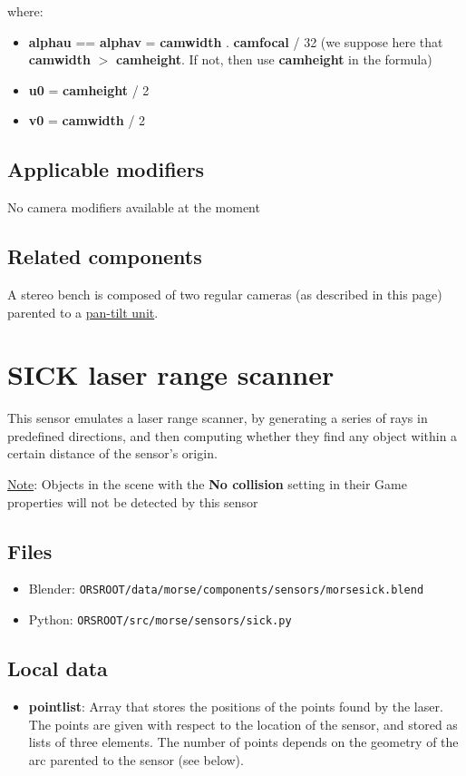 \documentclass[twoside,a4paper,10pt]{report}
\newcommand{\dokutitlelevelone}[1]{\chapter{#1}}
\newcommand{\dokutitleleveltwo}[1]{\section{#1}}
\newcommand{\dokubold}[1]{\textbf{#1}}
\newcommand{\dokumonospace}[1]{\texttt{#1}}
\newcommand{\dokuunderline}[1]{\underline{#1}}
\newcommand{\dokuitem}{\item}
\begin{document}
where:


\begin{itemize}
\dokuitem  \dokubold{alpha{\textunderscore}u} == \dokubold{ alpha{\textunderscore}v} = \dokubold{cam{\textunderscore}width} . \dokubold{cam{\textunderscore}focal} / 32 (we suppose here that \dokubold{cam{\textunderscore}width} $>$ \dokubold{cam{\textunderscore}height}. If not, then use \dokubold{cam{\textunderscore}height} in the formula)
\dokuitem  \dokubold{u{\textunderscore}0} = \dokubold{cam{\textunderscore}height} / 2
\dokuitem  \dokubold{v{\textunderscore}0} = \dokubold{cam{\textunderscore}width} / 2
\end{itemize}

\dokutitleleveltwo{Applicable modifiers}
\label{e70c0c8fd69fbf29dc4de09110825004}%

No camera modifiers available at the moment


\dokutitleleveltwo{Related components}
\label{72610f0a0494668833b2c5de69dd5e02}%

A stereo bench is composed of two regular cameras (as described in this page) parented to a \hyperref[44100c7b616b78eac7bbbd83ad6e4786]{ pan-tilt unit}.


\dokutitlelevelone{SICK laser range scanner}
\label{95f36fb9159a6cb3d088ef15be471622}%
\label{8d7d5ffd0031f2449cbeaef424c22d75}%

This sensor emulates a laser range scanner, by generating a series of rays in predefined directions, and then computing whether they find any object within a certain distance of the sensor's origin.

\dokuunderline{Note}: Objects in the scene with the \dokubold{No collision} setting in their Game properties will not be detected by this sensor


\dokutitleleveltwo{Files}
\label{45b963397aa40d4a0063e0d85e4fe7a1}%

\begin{itemize}
\dokuitem  Blender: \dokumonospace{{\textdollar}ORS{\textunderscore}ROOT/data/morse/components/sensors/morse{\textunderscore}sick.blend}
\dokuitem  Python: \dokumonospace{{\textdollar}ORS{\textunderscore}ROOT/src/morse/sensors/sick.py}
\end{itemize}

\dokutitleleveltwo{Local data}
\label{a53af9dae307d714362321cf5d55d89c}%

\begin{itemize}
\dokuitem  \dokubold{point{\textunderscore}list}: Array that stores the positions of the points found by the laser. The points are given with respect to the location of the sensor, and stored as lists of three elements. The number of points depends on the geometry of the arc parented to the sensor (see below).
\end{itemize}
\end{document}
